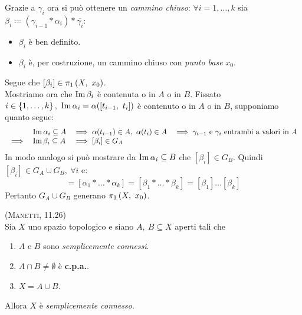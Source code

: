 \begin{demonstration}
\begin{center}
	\end{center}
		\vspace{-6mm}
	Grazie a $\gamma_i$ ora si può ottenere un \textit{cammino chiuso}: $\forall i=1,\dots,k$ sia $\beta_i\coloneqq (\gamma_{i-1}\ast \alpha_i)\ast\overline{\gamma_i}$:
	\begin{itemize}
		\item $\beta_i$ è ben definito.
		\item $\beta_i$ è, per costruzione, un cammino chiuso con \textit{punto base} $x_0$.
	\end{itemize} 
	Segue che $[\beta_i]\in \gruf{X}{x_0}$.\\
	Mostriamo ora che $\operatorname{Im} \beta_i$ è contenuta o in $A$ o in $B$. Fissato $i\in\left\{1,\dots,k\right\}, \ \im\alpha_i=\alpha([t_{i-1},\ t_i])$ è contenuto o in $A$ o in $B$, supponiamo quanto segue:
		\begin{equation*}
			\begin{array}{llll}
				&\operatorname{Im}\alpha_i \subseteq A &\implies \alpha(t_{i-1})\in A,\ \alpha(t_i)\in A &\implies \gamma_{i-1} \text{ e } \gamma_i \text{ entrambi a valori in }A \\ 
				\implies& \operatorname{Im}\beta_i \subseteq A &\implies [\beta_i]\in G_A&\\ 
			\end{array}
		\end{equation*}
	In modo analogo si può mostrare da $\operatorname{Im}\alpha_i \subseteq B$ che $[\beta_i]\in G_B$. Quindi $[\beta_i]\in G_A\cup G_B,\ \forall i$ e:
	\begin{equation*}
		[\alpha]=[\alpha_1 \ast \dots \ast\alpha_k]=[\beta_1\ast\dots\ast\beta_k]=[\beta_1]\dots [\beta_k]
	\end{equation*}
Pertanto $G_A\cup G_B$ generano $\gruf{X}{x_0}$.
\end{demonstration}
\begin{corollary} \textsc{(Manetti, 11.26)} \label{corollario Van Kampen}\\ 
	Sia $X$ uno spazio topologico e siano $A,\ B\subseteq X$ aperti tali che
		\begin{enumerate}
			\item $A$ e $B$ sono \textit{semplicemente connessi}.
			\item $A\cap B\neq\emptyset$ è \textbf{c.p.a.}.
			\item $X=A\cup B$.
		\end{enumerate}
	Allora $X$ è \textit{semplicemente connesso}.
\end{corollary}
